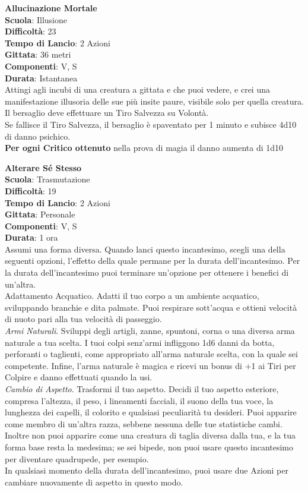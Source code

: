 \begin{multicols}{2}
\medskip\textbf{Allucinazione Mortale}\\
\textbf{Scuola}: Illusione\\
\textbf{Difficoltà}: 23\\
\textbf{Tempo di Lancio}: 2 Azioni\\
\textbf{Gittata}: 36 metri\\
\textbf{Componenti}: V, S\\
\textbf{Durata}: Istantanea\\
Attingi agli incubi di una creatura a gittata e che puoi vedere, e crei una manifestazione illusoria delle sue più insite paure, visibile solo per quella creatura. Il bersaglio deve effettuare un Tiro Salvezza su Volontà.\\
Se fallisce il Tiro Salvezza, il bersaglio è spaventato per 1 minuto e subisce 4d10 di danno psichico. \\
\textbf{Per ogni Critico ottenuto} nella prova di magia il danno aumenta di 1d10

\medskip\textbf{Alterare Sé Stesso}\\
\textbf{Scuola}: Trasmutazione\\
\textbf{Difficoltà}: 19\\
\textbf{Tempo di Lancio}: 2 Azioni\\
\textbf{Gittata}: Personale\\
\textbf{Componenti}: V, S\\
\textbf{Durata}: 1 ora\\
Assumi una forma diversa. Quando lanci questo incantesimo, scegli una della seguenti opzioni, l'effetto della quale permane per la durata dell'incantesimo. Per la durata dell'incantesimo puoi terminare un'opzione per ottenere i benefici di un'altra.\\
Adattamento Acquatico. Adatti il tuo corpo a un ambiente acquatico, sviluppando branchie e dita palmate. Puoi respirare sott'acqua e ottieni velocità di nuoto pari alla tua velocità di passeggio.\\
\textit{Armi Naturali}. Sviluppi degli artigli, zanne, spuntoni, corna o una diversa arma naturale a tua scelta. I tuoi colpi senz'armi infliggono 1d6 danni da botta, perforanti o taglienti, come appropriato all'arma naturale scelta, con la quale sei competente. Infine, l'arma naturale è magica e ricevi un bonus di +1 ai Tiri per Colpire e danno effettuati quando la usi.\\
\textit{Cambio di Aspetto}. Trasformi il tuo aspetto. Decidi il tuo aspetto esteriore, compresa l'altezza, il peso, i lineamenti facciali, il suono della tua voce, la lunghezza dei capelli, il colorito e qualsiasi peculiarità tu desideri. Puoi apparire come membro di un'altra razza, sebbene nessuna delle tue statistiche cambi. Inoltre non puoi apparire come una creatura di taglia diversa dalla tua, e la tua forma base resta la medesima; se sei bipede, non puoi usare questo incantesimo per diventare quadrupede, per esempio.\\
In qualsiasi momento della durata dell'incantesimo, puoi usare due Azioni per cambiare nuovamente di aspetto in questo modo.\\


\end{multicols}
